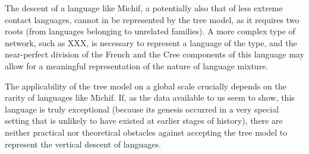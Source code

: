 \documentclass[svgnames,12pt]{scrartcl}
\begin{document}
The descent of a language like Michif, a potentially also that of less extreme contact languages, cannot in be represented by the tree model, as it requires two roots (from languages belonging to unrelated families). A more complex type of network, such as XXX, is necessary to represent a language of the type, and the near-perfect division of the French and the Cree components of this language may allow for a meaningful representation of the nature of language mixture.

The applicability of the tree model on a global scale crucially depends on the rarity of languages like Michif. If, as the data available to us seem to show, this language is truly exceptional (because its genesis occurred in a very special setting that is unlikely to have existed at earlier stages of history), there are neither practical nor theoretical obstacles against accepting the tree model to represent the vertical descent of languages.



\end{document}
